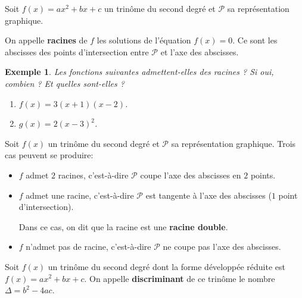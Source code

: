 \documentclass[a4paper,11pt]{article}
\theoremstyle{break}
\newcounter{enonce}
\newtheorem{exemple}[enonce]{Exemple}
\begin{document}
  
  \begin{definition}
    Soit $f(x)=ax^2+bx+c$ un trinôme du second degré et $\mathcal{P}$ sa représentation 
    graphique.
    
    On appelle \textbf{racines} de $f$ les solutions de l'équation $f(x)=0$. Ce sont les 
    abscisses des points d'intersection entre $\mathcal{P}$ et l'axe des abscisses.
    
  \end{definition}
  
  \begin{exemple}
    Les fonctions suivantes admettent-elles des racines ? Si oui, combien ? 
    Et quelles sont-elles ?
    \begin{enumerate}
     \item $f(x)=3(x+1)(x-2)$. 
     \item $g(x)=2(x-3)^2$.
    \end{enumerate}
  \end{exemple}
  
  \begin{proposition}
   Soit $f(x)$ un trinôme du second degré et $\mathcal{P}$ sa représentation graphique.
    Trois cas peuvent se produire:
   
   \begin{itemize}
    \item $f$ admet $2$ racines, c'est-à-dire $\mathcal{P}$ coupe l'axe des abscisses 
    en $2$ points.
    \item $f$ admet une racine, c'est-à-dire $\mathcal{P}$ est tangente à l'axe
    des abscisses ($1$ point d'intersection).
    
    Dans ce cas, on dit que la racine est une \textbf{racine double}.
    
    \item $f$ n'admet pas de racine, c'est-à-dire $\mathcal{P}$ ne coupe pas l'axe des abscisses.
   \end{itemize}
   
  \end{proposition}
  
  \vspace{10cm}
  
  
  
  \begin{definition}[Discriminant]
    Soit $f(x)$ un trinôme du second degré dont la forme développée réduite
    est $f(x)=ax^2+bx+c$. On appelle \textbf{discriminant} de ce trinôme
    le nombre $\Delta=b^2-4ac$.
    
    
  \end{definition}
  
\end{document}

